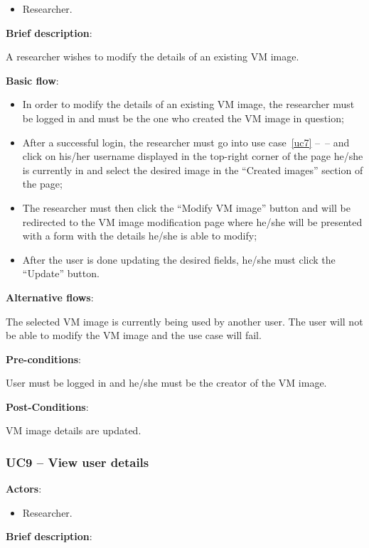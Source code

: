 \begin{itemize}
\item Researcher.
\end{itemize}

\textbf{Brief description}:

A researcher wishes to modify the details of an existing VM image. 

\textbf{Basic flow}:

\begin{itemize}
\item In order to modify the details of an existing VM image, the researcher must be logged in and must be the one who created the VM image in question;
\item After a successful login, the researcher must go into use case~\ref{uc7} --~-- and click on his/her username displayed in the top-right corner of the page he/she is currently in and select the desired image in the ``Created images'' section of the page;
\item The researcher must then click the ``Modify VM image'' button and will be redirected to the VM image modification page where he/she will be presented with a form with the details he/she is able to modify;
\item After the user is done updating the desired fields, he/she must click the ``Update'' button.
\end{itemize}

\textbf{Alternative flows}:

The selected VM image is currently being used by another user. The user will not be able to modify the VM image and the use case will fail.

\textbf{Pre-conditions}:

User must be logged in and he/she must be the creator of the VM image.

\textbf{Post-Conditions}:

VM image details are updated.


\subsubsection{UC9 -- View user details}\label{uc9}

\textbf{Actors}:

\begin{itemize}
\item Researcher.
\end{itemize}

\textbf{Brief description}:


